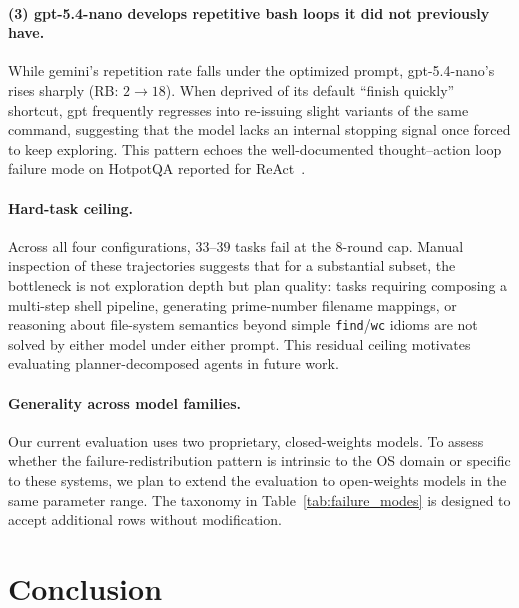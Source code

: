 \documentclass[11pt]{article}
\begin{document}
\paragraph{(3) gpt-5.4-nano develops repetitive bash loops it did not previously have.}
While gemini's repetition rate falls under the optimized prompt, gpt-5.4-nano's rises sharply (RB: $2\to 18$). When deprived of its default ``finish quickly'' shortcut, gpt frequently regresses into re-issuing slight variants of the same command, suggesting that the model lacks an internal stopping signal once forced to keep exploring. This pattern echoes the well-documented thought--action loop failure mode on HotpotQA reported for ReAct~\citep{yao2022react}.

\paragraph{Hard-task ceiling.}
Across all four configurations, $33$--$39$ tasks fail at the 8-round cap. Manual inspection of these trajectories suggests that for a substantial subset, the bottleneck is not exploration depth but plan quality: tasks requiring composing a multi-step shell pipeline, generating prime-number filename mappings, or reasoning about file-system semantics beyond simple \texttt{find}/\texttt{wc} idioms are not solved by either model under either prompt. This residual ceiling motivates evaluating planner-decomposed agents in future work.

\paragraph{Generality across model families.}
Our current evaluation uses two proprietary, closed-weights models. To assess whether the failure-redistribution pattern is intrinsic to the OS domain or specific to these systems, we plan to extend the evaluation to open-weights models in the same parameter range. The taxonomy in Table~\ref{tab:failure_modes} is designed to accept additional rows without modification.

\section{Conclusion}
\end{document}
